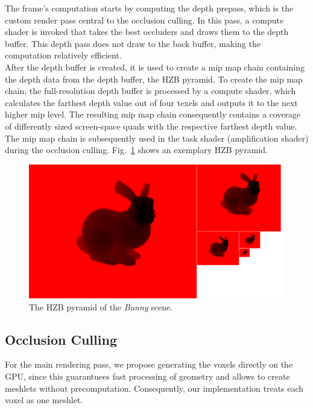 \documentclass[conference]{IEEEtran}
\begin{document}
\noindent
The frame's computation starts by computing the depth prepass, which is the custom
render pass central to the occlusion culling. In this pass, a compute shader is invoked
that takes the best occluders and draws them to the depth buffer. This depth pass does
not draw to the back buffer, making the computation relatively efficient. \\

\noindent
After the depth buffer is created, it is used to create a mip map chain containing the depth 
data from the depth buffer, the \ac{HZB} pyramid. To create the mip map chain, the full-resolution 
depth buffer is processed by a compute shader, which calculates the farthest depth value out 
of four texels and outputs it to the next higher mip level. The resulting mip map chain consequently 
contains a coverage of differently sized screen-space quads with the respective farthest depth 
value. The mip map chain is subsequently used in the task shader (amplification shader) during the 
occlusion culling. Fig.~\ref{fig:hzb-pyramid-viz} shows an exemplary \ac{HZB} pyramid.

\begin{figure}
    \includegraphics[width=\linewidth]{images/hiz-pyramid.png}
    \caption{The \ac{HZB} pyramid of the \emph{Bunny} scene.}
    \label{fig:hzb-pyramid-viz}
\end{figure}

\subsection{Occlusion Culling} \label{sec-occlusion-culling}

\noindent
For the main rendering pass, we propose generating the voxels directly on the \ac{GPU}, since this 
guarantuees fast processing of geometry and allows to create meshlets without precomputation.
Consequently, our implementation treats each voxel as one meshlet. \\
\end{document}
